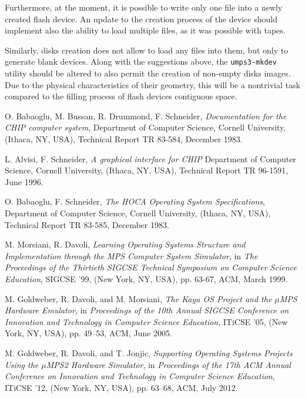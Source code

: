 \documentclass[12pt,a4paper,openright,twoside]{report}
\begin{document}
Furthermore, at the moment, it is possible to write only one file into a newly created flash device.
An update to the creation process of the device should implement also the ability to load multiple files, as it was possible with tapes.

Similarly, disks creation does not allow to load any files into them, but only to generate blank devices.
Along with the suggestions above, the \texttt{umps3-mkdev} utility should be altered to also permit the creation of non-empty disks images.
Due to the physical characteristics of their geometry, this will be a nontrivial task compared to the filling process of flash devices contiguous space.

\begin{thebibliography}{99}

	O. Babaoglu, M. Bussan, R. Drummond, F. Schneider,
	\textit{Documentation for the CHIP computer system},
	Department of Computer Science, Cornell University, (Ithaca, NY, USA), Technical Report TR 83-584, December 1983.

	L. Alvisi, F. Schneider,
	\textit{A graphical interface for CHIP}
	Department of Computer Science, Cornell University, (Ithaca, NY, USA), Technical Report TR 96-1591, June 1996.

	O. Babaoglu, F. Schneider,
	\textit{The HOCA Operating System Specifications},
	Department of Computer Science, Cornell University, (Ithaca, NY, USA), Technical Report TR 83-585, December 1983.

	M. Morsiani, R. Davoli,
	\textit{Learning Operating Systems Structure and Implementation through the MPS Computer System Simulator},
	in \textit{The Proceedings of the Thirtieth SIGCSE Technical Symposium on Computer Science Education},
	SIGCSE '99, (New York, NY, USA), pp. 63-67, ACM, March 1999.

	M. Goldweber, R. Davoli, and M. Morsiani,
	\textit{The Kaya OS Project and the $\mu$MPS Hardware Emulator},
	in \textit{Proceedings of the 10th Annual SIGCSE Conference on Innovation and Technology in Computer Science Education},
	ITiCSE '05, (New York, NY, USA), pp. 49–53, ACM, June 2005.

	M. Goldweber, R. Davoli, and T. Jonjic,
	\textit{Supporting Operating Systems Projects Using the $\mu$MPS2 Hardware Simulator},
	in \textit{Proceedings of the 17th ACM Annual Conference on Innovation and Technology in Computer Science Education},
	ITiCSE '12, (New York, NY, USA), pp. 63–68, ACM, July 2012.


\end{thebibliography}
\end{document}
